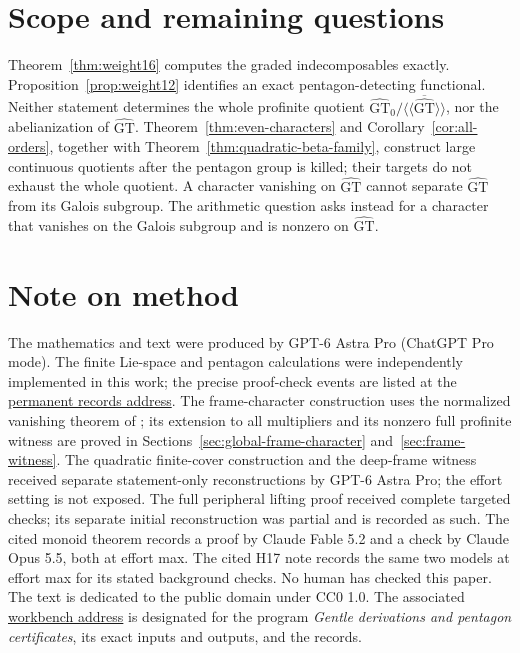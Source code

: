 \documentclass[11pt]{article}
\newcommand{\workbenchurl}{https://github.com/KokunoYumeto/k-theory-and-galois-groups-workbench}
\newcommand{\recordurl}{https://github.com/KokunoYumeto/mathematics-workbenches}
\newcommand{\GT}{\widehat{\mathrm{GT}}}
\newcommand{\GTz}{\widehat{\mathrm{GT}}_0}
\theoremstyle{definition}
\theoremstyle{remark}
\begin{document}

\section{Scope and remaining questions}
Theorem~\ref{thm:weight16} computes the graded indecomposables exactly.
Proposition~\ref{prop:weight12} identifies an exact pentagon-detecting
functional.  Neither statement determines the whole profinite quotient
$\GTz/\overline{\langle\!\langle\GT\rangle\!\rangle}$, nor the
abelianization of $\GT$.  Theorem~\ref{thm:even-characters} and
Corollary~\ref{cor:all-orders}, together with
Theorem~\ref{thm:quadratic-beta-family}, construct large continuous quotients after
the pentagon group is killed; their targets do not exhaust the whole
quotient.  A character vanishing on $\GT$ cannot separate
$\GT$ from its Galois subgroup.  The arithmetic question asks instead
for a character that vanishes on the Galois subgroup and is nonzero
on $\GT$.

\section*{Note on method}
The mathematics and text were produced by GPT-6 Astra Pro (ChatGPT Pro mode).
The finite Lie-space and pentagon calculations were independently
implemented in this work; the precise proof-check events are listed at
the \href{\recordurl}{permanent records address}.
The frame-character construction uses the normalized vanishing theorem
of \cite{H17}; its extension to all multipliers and its nonzero full
profinite witness are proved in Sections~\ref{sec:global-frame-character}
and~\ref{sec:frame-witness}.
The quadratic finite-cover construction and the deep-frame witness
received separate statement-only reconstructions by GPT-6 Astra Pro;
the effort setting is not exposed. The full peripheral lifting proof
received complete targeted checks; its separate initial reconstruction
was partial and is recorded as such. The cited monoid theorem records
a proof by Claude Fable 5.2 and a check by Claude Opus 5.5, both at
effort max. The cited H17 note records the same two models at effort
max for its stated background checks.
No human has checked this paper.
The text is dedicated to the public domain under CC0 1.0.
The associated \href{\workbenchurl}{workbench address} is designated
for the program \emph{Gentle derivations and pentagon certificates},
its exact inputs and outputs, and the records.
\end{document}
